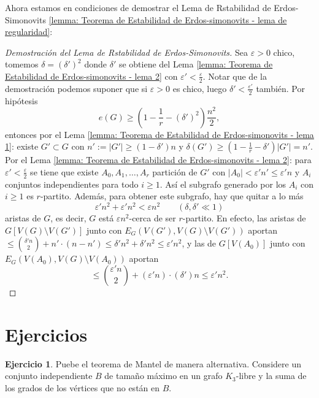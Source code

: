 \documentclass[12pt]{report}
\theoremstyle{plain}
\theoremstyle{definition}
\newtheorem{exercise}[theorem]{Ejercicio}
\newcommand{\abs}[1]{\left \vert #1 \right \vert}
\begin{document}
Ahora estamos en condiciones de demostrar el Lema de Rstabilidad de Erdos-Simonovits \ref{lemma: Teorema de Estabilidad de Erdos-simonovits - lema de regularidad}:

\begin{proof}[Demostración del Lema de Rstabilidad de Erdos-Simonovits]

Sea $\varepsilon > 0$ chico, tomemos $\delta = (\delta ')^2$ donde $\delta'$ se obtiene del Lema \ref{lemma: Teorema de Estabilidad de Erdos-simonovits - lema 2} con $\varepsilon ' < \frac \varepsilon 2$. Notar que de la demostración podemos suponer que si $\varepsilon > 0$ es chico, luego $\delta ' < \frac {\varepsilon ' }2$ también. Por hipótesis
\[
    e(G) \geq \left ( 1 - \frac 1 r - (\delta ')^2 \right ) \frac{n^2}{2},
\]
entonces por el Lema \ref{lemma: Teorema de Estabilidad de Erdos-simonovits - lema 1}: existe $G' \subset G$ con $n' := \abs{G'} \geq ( 1 - \delta ')n$ y $\delta (G') \geq \left ( 1 - \frac 1 r - \delta' \right) \abs {G'} = n'$. Por el Lema \ref{lemma: Teorema de Estabilidad de Erdos-simonovits - lema 2}: para $\varepsilon ' < \frac \varepsilon 2$ se tiene que existe $A_0, A_1, \ldots, A_r$ partición de $G'$ con $\abs {A_0} < \varepsilon ' n ' \leq \varepsilon ' n$ y $A_i$ conjuntos independientes para todo $i \geq 1$. Así el subgrafo generado por los $A_i$ con $i \geq 1$ es $r$-partito. Además, para obtener este subgrafo, hay que quitar a lo más
\[
    \varepsilon ' n ^2 + \varepsilon ' n^2 < \varepsilon n^2 \quad \quad ( \delta , \delta ' \ll 1)
\]
aristas de $G$, es decir, $G$ está $\varepsilon n^2$-cerca de ser $r$-partito. En efecto, las aristas de $G[V(G) \setminus V(G')]$ junto con $E_G(V(G'), V(G) \setminus V(G'))$ aportan $\leq \binom { \delta ' n} 2 + n' \cdot (n - n') \leq \delta ' n^2 + \delta ' n^2 \leq \varepsilon ' n^2$, y las de $G[V(A_0)]$ junto con $E_G(V(A_0), V(G) \setminus V(A_0))$ aportan
\[
    \leq \binom{\varepsilon' n}2 + (\varepsilon ' n) \cdot (\delta ') n \leq \varepsilon ' n^2.
\]
\end{proof}







\section{Ejercicios}

\begin{exercise}
Puebe el teorema de Mantel de manera alternativa. Considere un conjunto independiente $B$ de tamaño máximo en un grafo $K_3$-libre  y la suma de los grados de los vértices que no están en $B$.
\end{exercise}
\end{document}
